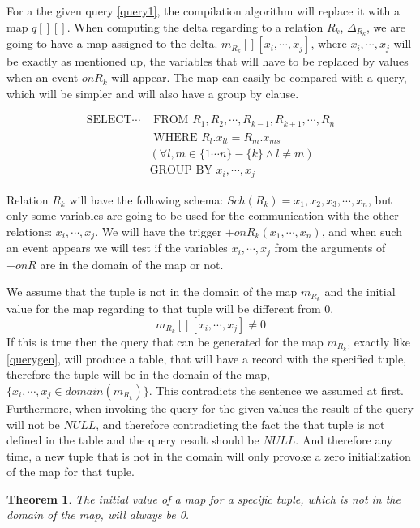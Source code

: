 \documentclass[12pt]{article}
\newtheorem{theorem}{Theorem}[section]
\begin{document}
For a the given query \ref{query1}, the compilation algorithm will replace it with a map $q[][]$. When computing the delta regarding to a relation $R_k$, $\Delta_{R_k}$, we are going to have a map assigned to the delta. $m_{R_k}[][x_i,\cdots,x_j]$, where $x_i,\cdots,x_j$ will be exactly as mentioned up, the variables that will have to be replaced by values when an event $onR_k$ will appear. The map can easily be compared with a query, which will be simpler and will also have a group by clause.

\begin{align}
\text{SELECT}\cdots&\text{ FROM }R_1,R_2,\cdots,R_{k-1},R_{k+1},\cdots,R_n\label{querygen}\\
&\text{ WHERE }R_l.x_{lt}=R_m.x_{ms}\nonumber\\
&(\forall l,m\in\{1\cdots n\}-\{k\}\land l\not=m)\nonumber\\
&\text{GROUP BY } x_i,\cdots,x_j\nonumber
\end{align}
	
Relation $R_k$ will have the following schema: $Sch(R_k)={x_1,x_2,x_3,\cdots,x_n}$, but only some variables are going to be used for the communication with the other relations: $x_i,\cdots,x_j$. We will have the trigger $+onR_k(x_1,\cdots,x_n)$, and when such an event appears we will test if the variables $x_i,\cdots,x_j$ from the arguments of $+onR$ are in the domain of the map or not. 
	
We assume that the tuple is not in the domain of the map $m_{R_k}$ and the initial value for the map regarding to that tuple will be different from 0.
$$m_{R_k}[][x_i,\cdots,x_j]\not= 0$$
If this is true then the query that can be generated for the map $m_{R_k}$, exactly like \ref{querygen},
will produce a table, that will have a record with the specified tuple, therefore the tuple will be in the domain of the map, $\{x_i,\cdots,x_j\in domain(m_{R_k}) \}$. This contradicts the sentence we assumed at first. Furthermore, when invoking the query for the given values the result of the query will not be $NULL$, and therefore contradicting the fact the that tuple is not defined in the table and the query result should be $NULL$. And therefore any time, a new tuple that is not in the domain will only provoke a zero initialization of the map for that tuple.

\begin{theorem}
The initial value of a map for a specific tuple, which is not in the domain of the map, will always be 0.
\end{theorem}
\end{document}
